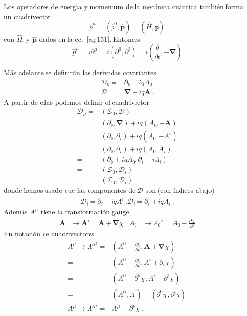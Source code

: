 \begin{frame}
Los operadores de energ\'\i a y momentum de la mec\'anica cu\'antica tambi\'en forma un cuadrivector
\begin{equation}
  \hat p^\mu=({\hat p}^0,\hat{\mathbf{p}})=(\widehat H,\hat{\mathbf{p}})
\end{equation}
con $\widehat H$, y $\hat{\mathbf{p}}$ dados en la ec.~\eqref{eq:151}. Entonces
\begin{equation}
  \label{eq:cv_hatpmu}
  \hat{p}^\mu=i\partial^\mu=i(\partial^0,\partial^i)=i(\frac{\partial}{\partial t},-\boldsymbol{\nabla})
\end{equation}
\end{frame}
Más adelante se definirán las derivadas  covariantes
\begin{align}
   \mathcal{D}_0=&\partial_0+i q A_0\nonumber\\
  \boldsymbol{\mathcal{D}}=&\boldsymbol{\nabla}-i q \mathbf{A}\,.
\end{align}
A partir de ellas podemos definir el cuadrivector
\begin{align}
  \mathcal{D}_\mu=&(\mathcal{D}_0,\boldsymbol{\mathcal{D}})\nonumber\\
=&(\partial_0,\boldsymbol{\nabla})+i q(A_0,-\mathbf{A})\nonumber\\
=&(\partial_0,\partial_i)+i q(A_0,-A^i)\nonumber\\
=&(\partial_0,\partial_i)+i q(A_0,A_i)\nonumber\\
=&(\partial_0+i q A_0,\partial_i+i A_i)\nonumber\\
=&(\mathcal{D}_0,\mathcal{D}_i)\nonumber\\
=&(\mathcal{D}_0,\mathcal{D}_i)\,,
\end{align}
donde hemos usado que las componentes de $\mathcal{D}$ son (con índices abajo)
\begin{align}
\mathcal{D}_i=\partial_i-i q A^i\,.
  \mathcal{D}_i=\partial_i+i q A_i\,.
\end{align}
Adem\'as $A^\mu$ tiene la transformaci\'on gauge
\begin{align}
  \mathbf{A}&\to\mathbf{A}'=\mathbf{A}+\boldsymbol{\nabla}\chi&
  A_0&\to A_0'=A_0-\frac{\partial\chi}{\partial t} 
\end{align}
En notaci\'on de cuadrivectores
\begin{align}
\label{eq:166qft}
  A^\mu\to {A'}^\mu=&\left(A^0-\frac{\partial\chi}{\partial t},\mathbf{A}+\boldsymbol{\nabla}\chi
  \right)\nonumber\\
  =&\left(A^0-\frac{\partial\chi}{\partial t},A^{i}+\partial_i\chi
  \right)\nonumber\\
  =&\left(A^0-\partial^0\chi,A^{i}-\partial^{i}\chi
  \right)\nonumber\\
  =&\left(A^0,A^{i}
  \right)-
  \left(
    \partial^0\chi,\partial^{i}\chi
  \right)\nonumber\\
  A^\mu\to {A'}^\mu=&A^\mu-\partial^\mu\chi\,.
\end{align}

